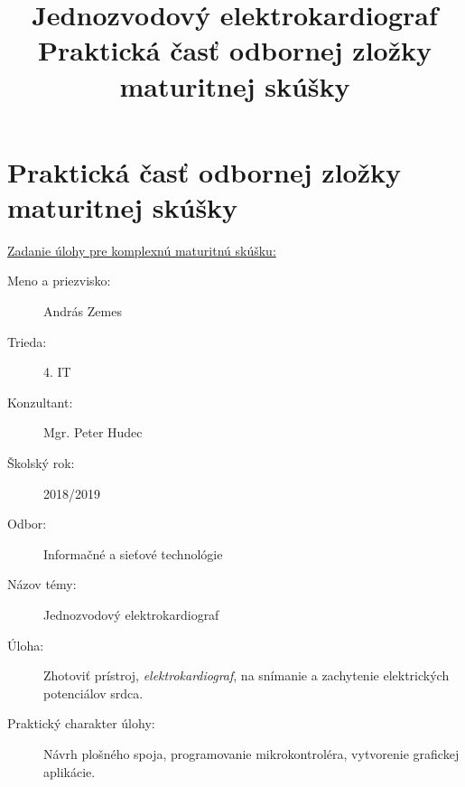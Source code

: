\documentclass[titlepage,12pt]{article}
\title{\textbf{Jednozvodový elektrokardiograf} \\
\large Praktická časť odbornej zložky maturitnej skúšky}
\date{\empty}
\begin{document}
\bgroup
	 {
		\fancyfoot[C] {\empty}		
	}
	\maketitle
\egroup

\restoregeometry

\setcounter{page}{2}
\section*{Praktická časť odbornej zložky maturitnej skúšky}
\underline{Zadanie úlohy pre komplexnú maturitnú skúšku:} 
\newline

\begin{description}
	\item [Meno a priezvisko:]
		\tabto{5cm} András Zemes
		
    \item [Trieda:]	
    	\tabto{5cm} 4. IT
    	
	\item [Konzultant:]		 	  
		\tabto{5cm} Mgr. Peter Hudec
		
	\item [Školský rok:] 
		\tabto{5cm} 2018/2019
		
	\item [Odbor:]		  
		\tabto{5cm} Informačné a sieťové technológie
		
	\item [Názov témy:]			  
		\tabto{5cm} Jednozvodový elektrokardiograf 
		
	\item [Úloha:]				  
		\tabto{5cm} Zhotoviť prístroj, \emph{elektrokardiograf}, na snímanie 
		\tabto{5cm} a zachytenie elektrických potenciálov srdca.
	
	\item [Praktický charakter úlohy:]
		\tabto{5cm} Návrh plošného spoja, programovanie 
		\tabto{5cm} mikrokontroléra, vytvorenie grafickej aplikácie.
		
\end{description}
	
\end{document}
